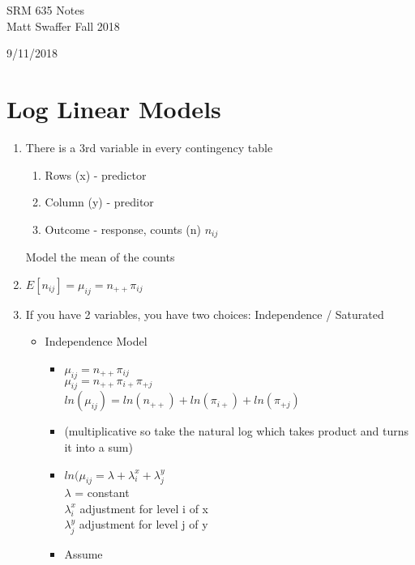 \documentclass[12 pt]{article}
\begin{document}
\begin{center}
	SRM 635 Notes\\
	\color{blue}
	Matt Swaffer Fall 2018
	\color{black}
\end{center}

\begin{center}
    9/11/2018
\end{center}
\section{Log Linear Models}
\begin{enumerate}
    \item There is a 3rd variable in every contingency table
        \begin{enumerate}
            \item Rows (x) - predictor
            \item Column (y) - preditor
            \item Outcome - response, counts (n) \( n_{ij}\)
        \end{enumerate}
        Model the mean of the counts
    \item \( E[n_{ij}] = \mu_{ij} = n_{++} \pi_{ij} \)
    \item If you have 2 variables, you have two choices: Independence / Saturated
        \begin{itemize}
            \item Independence Model
                \begin{itemize}
                    \item \( \mu_{ij} = n_{++} \pi_{ij} \)\\
                          \( \mu_{ij} = n_{++} \pi_{i+} \pi_{+j} \)\\
                          \( ln(\mu_{ij}) = ln(n_{++}) + ln(\pi_{i+}) + ln(\pi_{+j}) \) 
                    \item (multiplicative so take the natural log which takes product and turns it into a sum)
                    \item \( ln(\mu_{ij} = \lambda + \lambda^x_i + \lambda^y_j \)\\
                          \( \lambda \) = constant\\
                          \( \lambda^x_i \) adjustment for level i of x \\
                          \( \lambda^y_j \) adjustment for level j of y\\
                    \item Assume\\

\end{itemize}
\end{itemize}
\end{enumerate}
\end{document}
